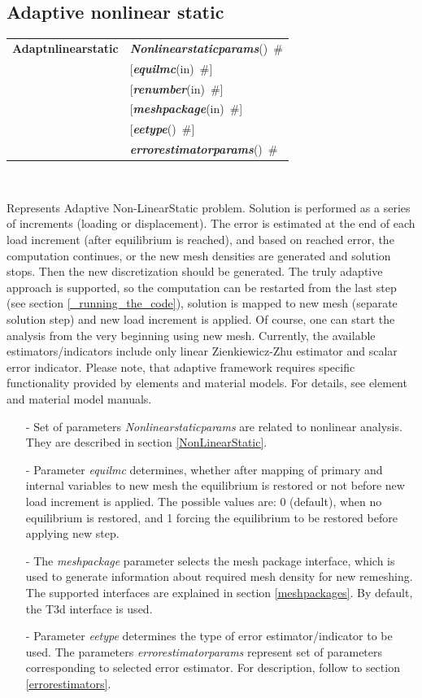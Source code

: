 \documentclass[a4paper]{article}
\makeatletter
\newcommand{\param}[1]{{\em #1}}
\newcommand{\keywordnotype}[1]{\mbox{{\it{\bf{#1}}}}}
\newcommand{\keyword}[2]{\mbox{{\keywordnotype{#1}\tiny (#2)}}}
\newcommand{\entKeywordInst}[1]{\mbox{{\bf{{#1}}}}}
\newcommand{\field}[2]{\mbox{\keyword{#1}{#2}~\#}}
\newcommand{\optField}[2]{\mbox{[\field{#1}{#2}]}}
\newenvironment{record}[1][]{\begin{tabular}{|ll}}{\end{tabular}\\}
\newcommand{\recentry}[2]{{#1}&{#2}\\}
\newcounter{rcc}
\newenvironment{record}[1][\textwidth]{\setcounter{rcc}{0}\begin{tabular*}{#1}{|ll@{\extracolsep{\fill}}r}}{\end{tabular*}\\}
\newcommand{\recentry}[2]{\ifthenelse{\value{rcc}>0}{&$\backslash$ \\}{\setcounter{rcc}{1}}{#1}&{#2}}
\makeatother
\begin{document}
\subsection{Adaptive nonlinear static}

\begin{record}
\recentry{\entKeywordInst{Adaptnlinearstatic}}{\field{Nonlinearstaticparams}{}}
\recentry{}{\optField{equilmc}{in}} \recentry{}{\optField{renumber}{in}} \recentry{}{\optField{meshpackage}{in}}
\recentry{}{\optField{eetype}{}} \recentry{}{\field{errorestimatorparams}{}}
\end{record}

Represents Adaptive Non-LinearStatic problem. Solution is performed  as a series of increments (loading or displacement).
The error is estimated at the end of each load increment (after
equilibrium is reached), and based on reached error, the computation
continues, or the new mesh densities are generated and solution
stops. Then the new discretization should be generated.
The truly adaptive approach is supported, so the computation can be
restarted from the last step (see section \ref{_running_the_code}), solution is mapped to new mesh (separate
solution step) and new load increment is applied. Of course, one can start the analysis from
the very beginning using new mesh. Currently, the available
estimators/indicators include only linear
Zienkiewicz-Zhu estimator and scalar error indicator. Please note, that adaptive framework requires
specific functionality provided by elements and material models. For
details, see element and material model manuals.
\begin{itemize}
\item[-]
Set of parameters \param{Nonlinearstaticparams} are related to
nonlinear analysis. They are described in section
\ref{NonLinearStatic}.
\item[-]
Parameter \param{equilmc} determines, whether after mapping of primary
and internal variables to new mesh the equilibrium is restored or not
before new load increment is applied. The possible values are: 0
(default), when no equilibrium is restored, and 1 forcing the
equilibrium to be restored before applying new step.
\item[-]
The \param{meshpackage} parameter selects the mesh package interface,
which is used to generate information about required mesh density for
new remeshing. The supported interfaces are explained in section
\ref{meshpackages}. By default, the T3d interface is used.
\item[-]
Parameter \param{eetype} determines the type of error
estimator/indicator to be used. The parameters
\param{errorestimatorparams} represent set of parameters corresponding
to selected error estimator. For description, follow to section
\ref{errorestimators}.
\end{itemize}
%
\end{document}
